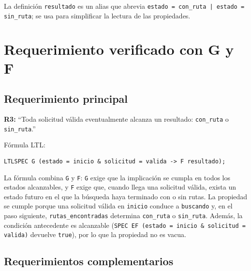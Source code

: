 \documentclass[11pt,a4paper]{article}
\begin{document}
La definición \texttt{resultado} es un alias que abrevia \texttt{estado = con\_ruta | estado = sin\_ruta}; se usa para simplificar la lectura de las propiedades.

\section{Requerimiento verificado con G y F}

\subsection{Requerimiento principal}

\textbf{R3:} ``Toda solicitud válida eventualmente alcanza un resultado: \texttt{con\_ruta} o \texttt{sin\_ruta}.''

Fórmula LTL:

\begin{lstlisting}
LTLSPEC G (estado = inicio & solicitud = valida -> F resultado);
\end{lstlisting}

La fórmula combina \texttt{G} y \texttt{F}: \texttt{G} exige que la implicación se cumpla en todos los estados alcanzables, y \texttt{F} exige que, cuando llega una solicitud válida, exista un estado futuro en el que la búsqueda haya terminado con o sin rutas. La propiedad se cumple porque una solicitud válida en \texttt{inicio} conduce a \texttt{buscando} y, en el paso siguiente, \texttt{rutas\_encontradas} determina \texttt{con\_ruta} o \texttt{sin\_ruta}. Además, la condición antecedente es alcanzable (\texttt{SPEC EF (estado = inicio \& solicitud = valida)} devuelve \texttt{true}), por lo que la propiedad no es vacua.

\subsection{Requerimientos complementarios}
\end{document}
